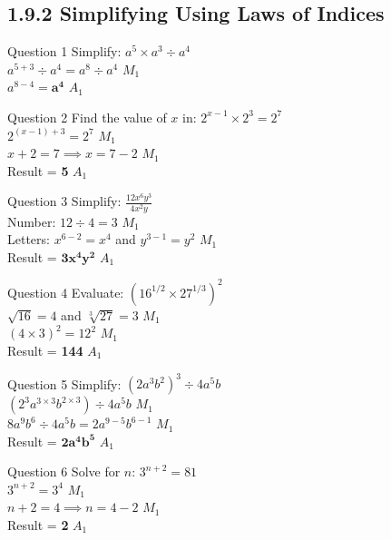 \documentclass[12pt, a4paper, oneside]{article}
\begin{document}
\subsection*{1.9.2 Simplifying Using Laws of Indices}

\begin{solvingbox}{Question 1}
Simplify: $a^5 \times a^3 \div a^4$ \\
$a^{5+3} \div a^4 = a^8 \div a^4$ \hfill $M_1$ \\
$a^{8-4} = \mathbf{a^4}$ \hfill $A_1$
\end{solvingbox}

\begin{solvingbox}{Question 2}
Find the value of $x$ in: $2^{x-1} \times 2^3 = 2^7$ \\
$2^{(x-1)+3} = 2^7$ \hfill $M_1$ \\
$x + 2 = 7 \implies x = 7 - 2$ \hfill $M_1$ \\
Result = \textbf{5} \hfill $A_1$
\end{solvingbox}

\begin{solvingbox}{Question 3}
Simplify: $\frac{12x^6 y^3}{4x^2 y}$ \\
Number: $12 \div 4 = 3$ \hfill $M_1$ \\
Letters: $x^{6-2} = x^4$ and $y^{3-1} = y^2$ \hfill $M_1$ \\
Result = $\mathbf{3x^4 y^2}$ \hfill $A_1$
\end{solvingbox}

\begin{solvingbox}{Question 4}
Evaluate: $(16^{1/2} \times 27^{1/3})^2$ \\
$\sqrt{16} = 4$ and $\sqrt[3]{27} = 3$ \hfill $M_1$ \\
$(4 \times 3)^2 = 12^2$ \hfill $M_1$ \\
Result = \textbf{144} \hfill $A_1$
\end{solvingbox}

\begin{solvingbox}{Question 5}
Simplify: $(2a^3 b^2)^3 \div 4a^5 b$ \\
$(2^3 a^{3 \times 3} b^{2 \times 3}) \div 4a^5 b$ \hfill $M_1$ \\
$8a^9 b^6 \div 4a^5 b = 2a^{9-5} b^{6-1}$ \hfill $M_1$ \\
Result = $\mathbf{2a^4 b^5}$ \hfill $A_1$
\end{solvingbox}

\begin{solvingbox}{Question 6}
Solve for $n$: $3^{n+2} = 81$ \\
$3^{n+2} = 3^4$ \hfill $M_1$ \\
$n+2 = 4 \implies n = 4 - 2$ \hfill $M_1$ \\
Result = \textbf{2} \hfill $A_1$
\end{solvingbox}
\end{document}
